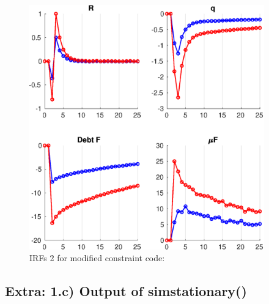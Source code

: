 \documentclass{article}
\begin{document}
\begin{figure}
\caption{IRFs 2 for modified constraint code:}
\includegraphics [width=4in]{PS03_projection_code_modif/Results/GR_res_converge1_diff_IRF2.eps}
\end{figure}



\subsection*{Extra: 1.c) Output of sim\textunderscore stationary()}
\end{document}

